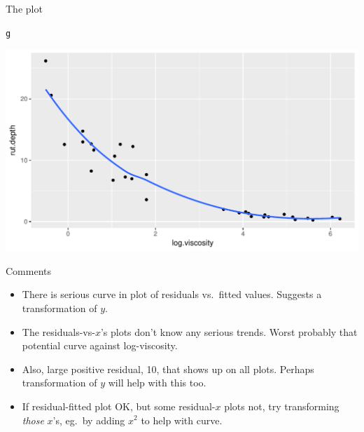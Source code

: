 \documentclass[unknownkeysallowed]{beamer}\usepackage[]{graphicx}\usepackage[]{color}
\makeatletter
\def\maxwidth{ %
  \ifdim\Gin@nat@width>\linewidth
    \linewidth
  \else
    \Gin@nat@width
  \fi
}
\newcommand{\hlstd}[1]{\textcolor[rgb]{0.345,0.345,0.345}{#1}}%
\newenvironment{kframe}{%
 \def\at@end@of@kframe{}%
 \ifinner\ifhmode%
  \def\at@end@of@kframe{\end{minipage}}%
  \begin{minipage}{\columnwidth}%
 \fi\fi%
 \def\FrameCommand##1{\hskip\@totalleftmargin \hskip-\fboxsep
 \colorbox{shadecolor}{##1}\hskip-\fboxsep
     \hskip-\linewidth \hskip-\@totalleftmargin \hskip\columnwidth}%
 \MakeFramed {\advance\hsize-\width
   \@totalleftmargin\z@ \linewidth\hsize
   \@setminipage}}%
 {\par\unskip\endMakeFramed%
 \at@end@of@kframe}
\newenvironment{knitrout}{}{} %
\makeatother
\begin{document}
\begin{frame}[fragile]{The plot}
  
\begin{knitrout}
\color{fgcolor}\begin{kframe}
\begin{alltt}
\hlstd{g}
\end{alltt}
\end{kframe}
\includegraphics[width=\maxwidth]{figure/unnamed-chunk-284-1} 

\end{knitrout}
  
\end{frame}


\begin{frame}[fragile]{Comments}
  
  \begin{itemize}
  \item There is serious curve in plot of residuals vs.\ fitted
    values. Suggests a transformation of $y$.
  \item The residuals-vs-$x$'s plots don't know any serious
    trends. Worst probably that potential curve against log-viscosity.
  \item Also, large positive residual, 10, that shows up on all
    plots. Perhaps transformation of $y$ will help with this too.
  \item If residual-fitted plot OK, but some residual-$x$ plots not,
    try transforming \emph{those} $x$'s, eg.\ by adding $x^2$ to help
    with curve.
  \end{itemize}
\end{frame}
\end{document}
